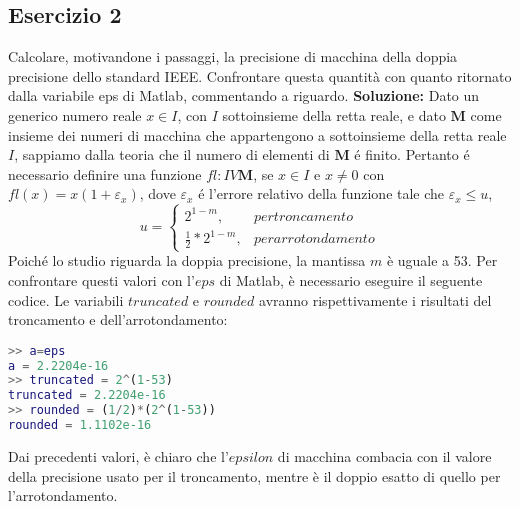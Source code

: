 \subsection{Esercizio 2}
Calcolare, motivandone i passaggi, la precisione di macchina della doppia precisione
dello standard IEEE. Confrontare questa quantità con quanto ritornato dalla variabile eps di
Matlab, commentando a riguardo.
\textbf{Soluzione:} \newline
Dato un generico numero reale $x \in I$, con $I$ sottoinsieme della retta reale, e
dato $\mathbf{M}$ come insieme dei numeri di macchina che appartengono a sottoinsieme
della retta reale $I$, sappiamo dalla teoria che il numero di elementi di $\mathbf{M}$ é finito.
Pertanto é necessario definire una funzione $fl: I V \mathbf{M}$, se $x \in I$ e $x \neq 0$ con
$fl(x) = x(1 + \varepsilon_x)$, dove $\varepsilon_x$ é l'errore relativo della funzione tale che $\varepsilon_x \leq u$,
\begin{equation*}
    u =\begin{cases}
        2^{1-m},             & per troncamento    \\
        \frac{1}{2}*2^{1-m}, & per arrotondamento
    \end{cases}
\end{equation*}
Poiché lo studio riguarda la doppia precisione, la mantissa $m$ è uguale a 53.
Per confrontare questi valori con l'$eps$ di Matlab, è necessario eseguire il seguente codice.
Le variabili $truncated$ e $rounded$ avranno rispettivamente i risultati del troncamento e dell'arrotondamento:
\begin{lstlisting}[language=Matlab]
>> a=eps
a = 2.2204e-16
>> truncated = 2^(1-53)
truncated = 2.2204e-16
>> rounded = (1/2)*(2^(1-53))
rounded = 1.1102e-16
\end{lstlisting}
Dai precedenti valori, è chiaro che l'$epsilon$ di macchina combacia con il valore
della precisione usato per il troncamento, mentre è il doppio esatto di quello per
l'arrotondamento.
